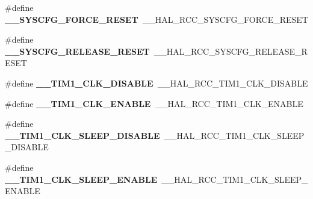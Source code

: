 \begin{DoxyCompactItemize}
\item 
\hypertarget{group___h_a_l___r_c_c___aliased_ga4beacdd25611c64ffc04f6b7e6981e65}{\#define {\bfseries \-\_\-\-\_\-\-S\-Y\-S\-C\-F\-G\-\_\-\-F\-O\-R\-C\-E\-\_\-\-R\-E\-S\-E\-T}~\-\_\-\-\_\-\-H\-A\-L\-\_\-\-R\-C\-C\-\_\-\-S\-Y\-S\-C\-F\-G\-\_\-\-F\-O\-R\-C\-E\-\_\-\-R\-E\-S\-E\-T}\label{group___h_a_l___r_c_c___aliased_ga4beacdd25611c64ffc04f6b7e6981e65}

\item 
\hypertarget{group___h_a_l___r_c_c___aliased_ga9460d38c3a8c209620b68453a12c6c56}{\#define {\bfseries \-\_\-\-\_\-\-S\-Y\-S\-C\-F\-G\-\_\-\-R\-E\-L\-E\-A\-S\-E\-\_\-\-R\-E\-S\-E\-T}~\-\_\-\-\_\-\-H\-A\-L\-\_\-\-R\-C\-C\-\_\-\-S\-Y\-S\-C\-F\-G\-\_\-\-R\-E\-L\-E\-A\-S\-E\-\_\-\-R\-E\-S\-E\-T}\label{group___h_a_l___r_c_c___aliased_ga9460d38c3a8c209620b68453a12c6c56}

\item 
\hypertarget{group___h_a_l___r_c_c___aliased_gac374cff1e951672a19aa5857c58674f7}{\#define {\bfseries \-\_\-\-\_\-\-T\-I\-M1\-\_\-\-C\-L\-K\-\_\-\-D\-I\-S\-A\-B\-L\-E}~\-\_\-\-\_\-\-H\-A\-L\-\_\-\-R\-C\-C\-\_\-\-T\-I\-M1\-\_\-\-C\-L\-K\-\_\-\-D\-I\-S\-A\-B\-L\-E}\label{group___h_a_l___r_c_c___aliased_gac374cff1e951672a19aa5857c58674f7}

\item 
\hypertarget{group___h_a_l___r_c_c___aliased_gaca66d24989c6306dabafd38dd3b2a34f}{\#define {\bfseries \-\_\-\-\_\-\-T\-I\-M1\-\_\-\-C\-L\-K\-\_\-\-E\-N\-A\-B\-L\-E}~\-\_\-\-\_\-\-H\-A\-L\-\_\-\-R\-C\-C\-\_\-\-T\-I\-M1\-\_\-\-C\-L\-K\-\_\-\-E\-N\-A\-B\-L\-E}\label{group___h_a_l___r_c_c___aliased_gaca66d24989c6306dabafd38dd3b2a34f}

\item 
\hypertarget{group___h_a_l___r_c_c___aliased_ga4c6a5618073539cc5ae7f4662dfa96d9}{\#define {\bfseries \-\_\-\-\_\-\-T\-I\-M1\-\_\-\-C\-L\-K\-\_\-\-S\-L\-E\-E\-P\-\_\-\-D\-I\-S\-A\-B\-L\-E}~\-\_\-\-\_\-\-H\-A\-L\-\_\-\-R\-C\-C\-\_\-\-T\-I\-M1\-\_\-\-C\-L\-K\-\_\-\-S\-L\-E\-E\-P\-\_\-\-D\-I\-S\-A\-B\-L\-E}\label{group___h_a_l___r_c_c___aliased_ga4c6a5618073539cc5ae7f4662dfa96d9}

\item 
\hypertarget{group___h_a_l___r_c_c___aliased_ga3ffdcca982a4a5d4b024e43cbcb5f1fe}{\#define {\bfseries \-\_\-\-\_\-\-T\-I\-M1\-\_\-\-C\-L\-K\-\_\-\-S\-L\-E\-E\-P\-\_\-\-E\-N\-A\-B\-L\-E}~\-\_\-\-\_\-\-H\-A\-L\-\_\-\-R\-C\-C\-\_\-\-T\-I\-M1\-\_\-\-C\-L\-K\-\_\-\-S\-L\-E\-E\-P\-\_\-\-E\-N\-A\-B\-L\-E}\label{group___h_a_l___r_c_c___aliased_ga3ffdcca982a4a5d4b024e43cbcb5f1fe}


\end{DoxyCompactItemize}
